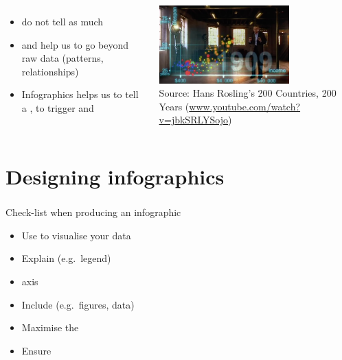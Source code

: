 \documentclass[8pt]{beamer}
\begin{document}
\begin{frame}
\frametitle{\insertsection}

\begin{columns}[c]
    \begin{itemize}
    \item {\color{blue}{Raw data}} do not tell as much
    \item {\color{blue}{Statistics}} and {\color{blue}{visualisation}} help us to go beyond raw data (patterns, relationships)
    \item Infographics helps us to tell a {\color{blue}{story}}, to trigger {\color{blue}{emotions}} and {\color{blue}{actions}}
\end{itemize}

\centering
\includegraphics[width=5cm]{gapminder}\\
\tiny{Source: Hans Rosling's 200 Countries, 200 Years (\url{www.youtube.com/watch?v=jbkSRLYSojo})}
\end{columns}

\end{frame}





\section{Designing infographics}


\begin{frame}
\frametitle{\insertsection}

Check-list when producing an infographic
\begin{itemize}
\item Use {\color{blue}{appropriate charts}} to visualise your data
\item Explain {\color{blue}{encoding}} (e.g.\ legend)
\item {\color{blue}{Label}} axis
\item Include {\color{blue}{sources}} (e.g.\ figures, data)
\item Maximise the {\color{blue}{data-ink ratio}}
\item Ensure {\color{blue}{graphical integrity}}
\end{itemize}

\end{frame}
\end{document}
